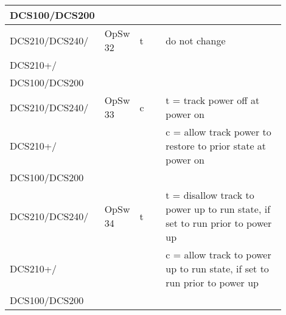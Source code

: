 \begin{tabular}{|p{0.2\linewidth}|p{0.125\linewidth}|p{0.1\linewidth}|p{0.475\linewidth}|}
DCS100/DCS200 &&&\\
\hline
DCS210/DCS240/ & OpSw 32 & t & do not change\\
DCS210+/ &&&\\
DCS100/DCS200 &&&\\
\hline
DCS210/DCS240/ & OpSw 33 & c & t = track power off at power on\\
DCS210+/&&& c = allow track power to restore to prior state at power on\\
DCS100/DCS200 &&&\\
\hline
DCS210/DCS240/ & OpSw 34 & t & t = disallow track to power up to run state, if set to run prior to power up\\
DCS210+/&& & c = allow track to power up to run state, if set to run prior to power up\\
DCS100/DCS200 &&&\\
\hline
\end{tabular}
\newpage

